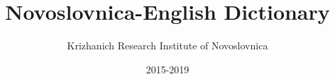 \documentclass[12pt]{book}
\begin{document}
\begin{titlepage}

\author{Krizhanich Research Institute of Novoslovnica}
\title{%
	Novoslovnica-English Dictionary
\vfill
}
\date{2015-2019}

\end{titlepage}

\frontmatter
\maketitle


\tableofcontents
\mainmatter




































% 
% 


\backmatter
\end{document}
